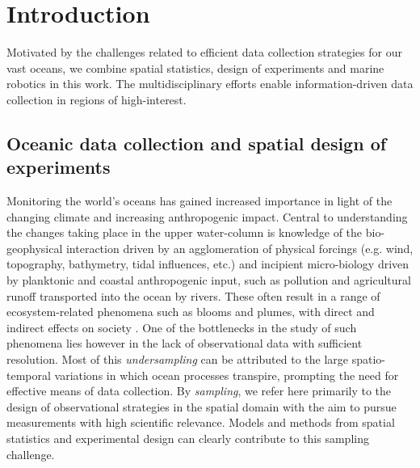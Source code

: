 \documentclass[aoas]{imsart}
\begin{document}
\section{Introduction}


Motivated by the challenges related to efficient data collection
strategies for our vast oceans, we combine spatial statistics, design
of experiments and marine robotics in this work.  The
multidisciplinary efforts enable information-driven data collection in
regions of high-interest.


\subsection{Oceanic data collection and spatial design of experiments}


Monitoring the world's oceans has gained increased importance in light
of the changing climate and increasing anthropogenic impact. Central
to understanding the changes taking place in the upper water-column is
knowledge of the bio-geophysical interaction driven by an
agglomeration of physical forcings (e.g. wind, topography, bathymetry,
tidal influences, etc.) and incipient micro-biology driven by
planktonic and coastal anthropogenic input, such as pollution and
agricultural runoff transported into the ocean by rivers.  These often
result in a range of ecosystem-related phenomena such as blooms and
plumes, with direct and indirect effects on society \citep{ryan2017}. One of the
bottlenecks in the study of such phenomena lies however in the lack of
observational data with sufficient resolution. Most of this
\emph{undersampling} can be attributed to the large spatio-temporal
variations in which ocean processes transpire, prompting the need for
effective means of data collection.  By \emph{sampling}, we refer here
primarily to the design of observational strategies in the spatial
domain with the aim to pursue measurements with high scientific
relevance.  Models and methods from spatial statistics and experimental design can clearly contribute to this sampling challenge.

 
\end{document}
